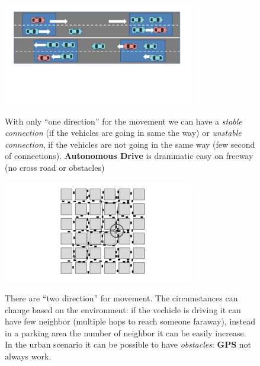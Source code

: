 \begin{figure}[h]
    \centering
    \begin{minipage}[t]{0.45\textwidth}
        \centering
        \includegraphics[width=0.75\textwidth]{img/v2x_freeway}

        \begin{flushleft}
            With only ``one direction'' for the movement we can have a \textit{stable connection} (if the vehicles are going in same the way) or \textit{unstable connection}, if the vehicles are not going in the same way (few second of connections).
            \textbf{Autonomous Drive} is drammatic easy on freeway (no cross road or obstacles)
        \end{flushleft}
    \end{minipage}
    \begin{minipage}[t]{0.45\textwidth}
        \centering
        \includegraphics[width=0.75\textwidth]{img/v2x_urban}

        \begin{flushleft}
            There are ``two direction'' for movement. The circumstances can change based on the environment: if the vechicle is driving it can have few neighbor (multiple hops to reach someone faraway), instead in a parking area the number of neighbor it can be easily increase. In the urban scenario it can be possible to have \textit{obstacles}: \textbf{GPS} not always work.
        \end{flushleft}
    \end{minipage}
\end{figure}
